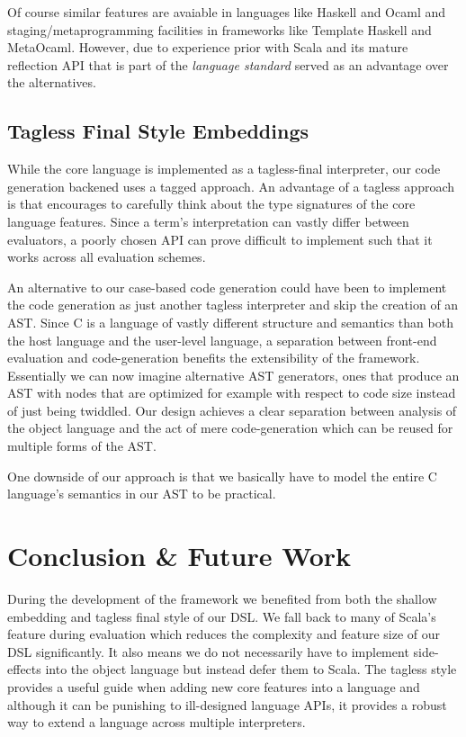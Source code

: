 \documentclass{article}
\begin{document}
Of course similar features are avaiable in languages like Haskell and Ocaml and staging/metaprogramming facilities in frameworks like Template Haskell and MetaOcaml. However, due to experience prior with Scala and its mature reflection API that is part of the \textit{language standard}
served as an advantage over the alternatives.

\subsection{Tagless Final Style Embeddings}\label{subsec:tagless}
While the core language is implemented as a tagless-final interpreter, our code generation backened uses a tagged approach. An advantage of a tagless approach is that encourages to carefully think about the type signatures of the core language features. Since a term's interpretation
can vastly differ between evaluators, a poorly chosen API can prove difficult to implement such that it works across all evaluation schemes.

An alternative to our case-based code generation could have been to implement the code generation as just another tagless interpreter and skip the creation of an AST. Since C is a language of vastly different structure and semantics than both the host language and the user-level language,
a separation between front-end evaluation and code-generation benefits the extensibility of the framework. Essentially we can now imagine alternative AST generators, ones that produce an AST with nodes that are optimized for example with respect to code size instead of just being twiddled. Our design achieves
a clear separation between analysis of the object language and the act of mere code-generation which can be reused for multiple forms of the AST.

One downside of our approach is that we basically have to model the entire C language's semantics in our AST to be practical.

\section{Conclusion \& Future Work}
During the development of the framework we benefited from both the shallow embedding and tagless final style of our DSL. We fall back to many of Scala's feature during evaluation which reduces the complexity and feature size of our DSL significantly. It also
means we do not necessarily have to implement side-effects into the object language but instead defer them to Scala. The tagless style provides a useful guide when adding new core features into a language and although it can be punishing to ill-designed language
APIs, it provides a robust way to extend a language across multiple interpreters.
\end{document}
